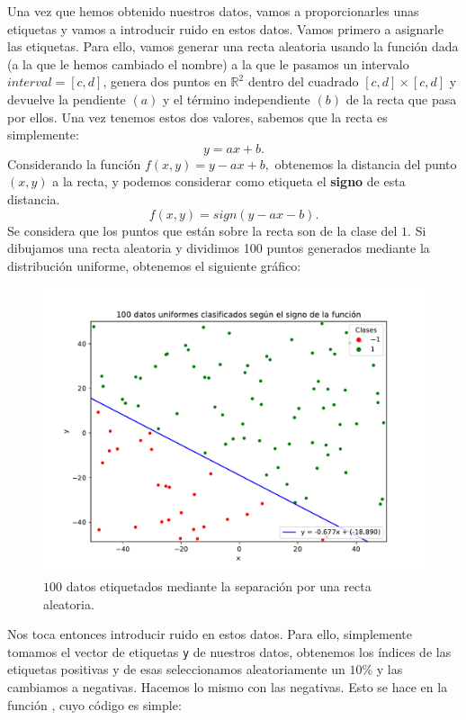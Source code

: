 \documentclass[12pt]{article}
\begin{document}
{Una vez que hemos obtenido nuestros datos, vamos a proporcionarles unas etiquetas y vamos a introducir ruido en estos datos. Vamos primero a asignarle las etiquetas. Para ello, vamos generar una recta aleatoria usando la función dada (a la que le hemos cambiado el nombre)  a la que le pasamos un intervalo $interval = [c,d]$, genera dos puntos en $\mathbb R^2$ dentro del cuadrado $[c,d]\times [c,d]$ y devuelve la pendiente $(a)$ y el término independiente $(b)$ de la recta que pasa por ellos. Una vez tenemos estos dos valores, sabemos que la recta es simplemente:
$$
y = ax + b.
$$
Considerando la función $f(x,y) = y- ax +b,$ obtenemos la distancia del punto $(x,y)$ a la recta, y podemos considerar como etiqueta el \textbf{signo} de esta distancia.
$$
f(x,y) = sign(y - ax - b).
$$
Se considera que los puntos que están sobre la recta son de la clase del $1$. Si dibujamos una recta aleatoria y dividimos 100 puntos generados mediante la distribución uniforme, obtenemos el siguiente gráfico:
\begin{figure}[H]
  \centering
  \includegraphics[scale = 0.4]{media/100-datos-separados.pdf}
  \caption{$100$ datos etiquetados mediante la separación por una recta aleatoria.}
\end{figure}

Nos toca entonces introducir ruido en estos datos.  Para ello, simplemente tomamos el vector de etiquetas \lstinline{y} de nuestros datos, obtenemos los índices de las etiquetas positivas  y de esas seleccionamos aleatoriamente un $10\%$ y las cambiamos a negativas. Hacemos lo mismo con las negativas. Esto se hace en la función , cuyo código es simple:

}
\end{document}
